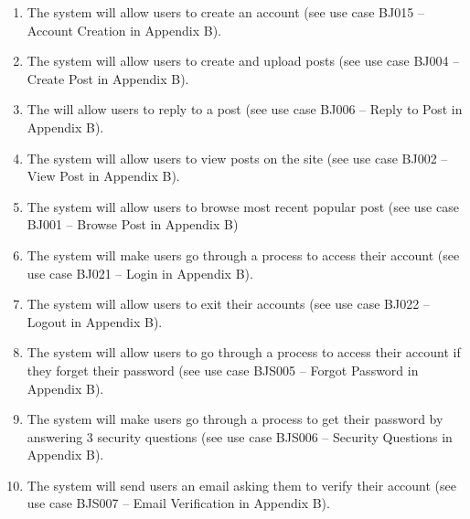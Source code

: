 \documentclass{report}
\begin{document}
	\begin{enumerate}
		\item The system will allow users to create an account (see use case BJ015 – Account Creation in Appendix B).\\
		\item The system will allow users to create and upload posts (see use case BJ004 – Create Post in Appendix B).\\
		\item The will allow users to reply to a post (see use case BJ006 – Reply to Post in Appendix B).\\
		\item The system will allow users to view posts on the site (see use case BJ002 – View Post in Appendix B).\\
		\item The system will allow users to browse most recent popular post (see use case BJ001 – Browse Post in Appendix B)\\
		\item The system will make users go through a process to access their account (see use case BJ021 – Login in Appendix B).\\
		\item The system will allow users to exit their accounts (see use case BJ022 – Logout in Appendix B).\\
		\item The system will allow users to go through a process to access their account if they forget their password (see use case BJS005 – Forgot Password in Appendix B).\\
		\item The system will make users go through a process to get their password by answering 3 security questions (see use case BJS006 – Security Questions in Appendix B).\\
		\item The system will send users an email asking them to verify their account (see use case BJS007 – Email Verification in Appendix B).\\
	\end{enumerate}
\end{document}
